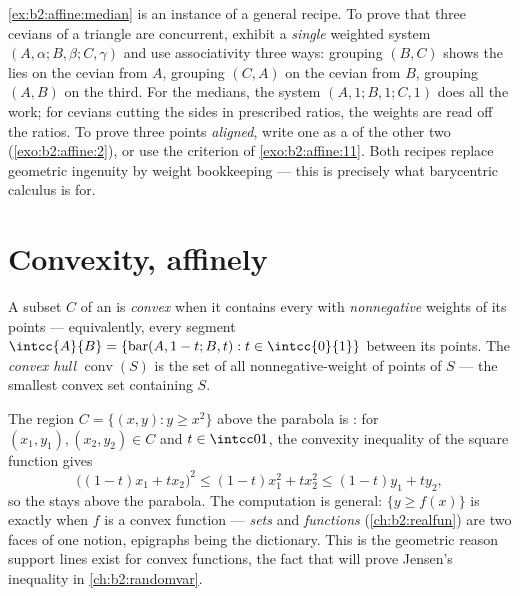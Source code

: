 \begin{remark}
\cref{ex:b2:affine:median} is an instance of a general
recipe. To prove that three cevians of a triangle are
concurrent, exhibit a \emph{single} weighted system $(A,
\alpha; B, \beta; C, \gamma)$ and use associativity three
ways: grouping $(B, C)$ shows the  lies on the
cevian from $A$, grouping $(C, A)$ on the cevian from $B$,
grouping $(A, B)$ on the third. For the medians, the system
$(A, 1; B, 1; C, 1)$ does all the work; for cevians cutting
the sides in prescribed ratios, the weights are read off the
ratios. To prove three points \emph{aligned}, write one as a
 of the other two (\cref{exo:b2:affine:2}), or use
the  criterion of \cref{exo:b2:affine:11}. Both
recipes replace geometric ingenuity by weight bookkeeping ---
this is precisely what barycentric calculus is for.
\end{remark}

\section{Convexity, affinely}

\begin{definition}\label{def:b2:affine:convex}
A subset $C$ of an  is \emph{convex} when it contains
every  with \emph{nonnegative} weights of its points ---
equivalently, every segment $\intcc{A}{B} = \{\operatorname{bar}(A,
1-t; B, t) : t \in \intcc{0}{1}\}$ between its points. The
\emph{convex hull} $\operatorname{conv}(S)$ is the set of all
nonnegative-weight  of points of $S$ --- the smallest
convex set containing $S$.
\end{definition}

\begin{example}\label{ex:b2:affine:epigraph}
The region $C = \{(x, y) : y \geq x^2\}$ above the parabola
is : for $(x_1, y_1), (x_2, y_2) \in C$ and $t \in
\intcc01$, the convexity inequality of the square function
gives
\[
\bigl((1-t)x_1 + tx_2\bigr)^2 \leq (1-t)x_1^2 + tx_2^2
\leq (1-t)y_1 + ty_2 ,
\]
so the  stays above the parabola. The computation
is general: $\{y \geq f(x)\}$ is  exactly when $f$ is a
convex function ---  \emph{sets} and 
\emph{functions} (\cref{ch:b2:realfun}) are two faces of one
notion, epigraphs being the dictionary. This is the geometric
reason support lines exist for convex functions, the fact
that will prove Jensen's inequality in
\cref{ch:b2:randomvar}.
\end{example}

